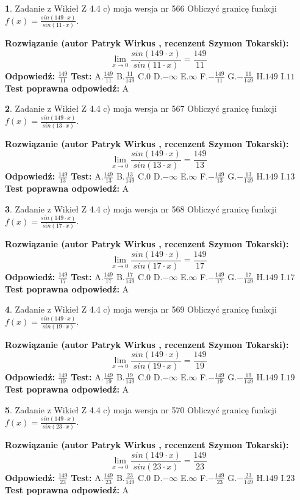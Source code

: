\documentclass[12pt, a4paper]{article}
\theoremstyle{definition} %
\newtheorem{zad}{}
\newcommand{\zadStart}[1]{\begin{zad}#1\newline}
\newcommand{\zadStop}{\end{zad}}
\newcommand{\rozwStart}[2]{\noindent \textbf{Rozwiązanie (autor #1 , recenzent #2): }\newline}
\newcommand{\rozwStop}{\newline}
\newcommand{\odpStart}{\noindent \textbf{Odpowiedź:}\newline}
\newcommand{\odpStop}{\newline}
\newcommand{\testStart}{\noindent \textbf{Test:}\newline}
\newcommand{\testStop}{\newline}
\newcommand{\kluczStart}{\noindent \textbf{Test poprawna odpowiedź:}\newline}
\newcommand{\kluczStop}{\newline}
\begin{document}
\zadStart{Zadanie z Wikieł Z 4.4 c) moja wersja nr 566}
Obliczyć granicę funkcji $f(x)=\frac{sin(149\cdot x)}{sin(11\cdot x)}$.
\zadStop
\rozwStart{Patryk Wirkus}{Szymon Tokarski}
$$\lim\limits_{x\to 0}\frac{sin(149\cdot x)}{sin(11\cdot x)}=
\frac{149}{11}$$
\rozwStop
\odpStart
$\frac{149}{11}$
\odpStop
\testStart
A.$\frac{149}{11}$
B.$\frac{11}{149}$
C.$0$
D.$-\infty$
E.$\infty$
F.$-\frac{149}{11}$
G.$-\frac{11}{149}$
H.$149$
I.$11$
\testStop
\kluczStart
A
\kluczStop



\zadStart{Zadanie z Wikieł Z 4.4 c) moja wersja nr 567}
Obliczyć granicę funkcji $f(x)=\frac{sin(149\cdot x)}{sin(13\cdot x)}$.
\zadStop
\rozwStart{Patryk Wirkus}{Szymon Tokarski}
$$\lim\limits_{x\to 0}\frac{sin(149\cdot x)}{sin(13\cdot x)}=
\frac{149}{13}$$
\rozwStop
\odpStart
$\frac{149}{13}$
\odpStop
\testStart
A.$\frac{149}{13}$
B.$\frac{13}{149}$
C.$0$
D.$-\infty$
E.$\infty$
F.$-\frac{149}{13}$
G.$-\frac{13}{149}$
H.$149$
I.$13$
\testStop
\kluczStart
A
\kluczStop



\zadStart{Zadanie z Wikieł Z 4.4 c) moja wersja nr 568}
Obliczyć granicę funkcji $f(x)=\frac{sin(149\cdot x)}{sin(17\cdot x)}$.
\zadStop
\rozwStart{Patryk Wirkus}{Szymon Tokarski}
$$\lim\limits_{x\to 0}\frac{sin(149\cdot x)}{sin(17\cdot x)}=
\frac{149}{17}$$
\rozwStop
\odpStart
$\frac{149}{17}$
\odpStop
\testStart
A.$\frac{149}{17}$
B.$\frac{17}{149}$
C.$0$
D.$-\infty$
E.$\infty$
F.$-\frac{149}{17}$
G.$-\frac{17}{149}$
H.$149$
I.$17$
\testStop
\kluczStart
A
\kluczStop



\zadStart{Zadanie z Wikieł Z 4.4 c) moja wersja nr 569}
Obliczyć granicę funkcji $f(x)=\frac{sin(149\cdot x)}{sin(19\cdot x)}$.
\zadStop
\rozwStart{Patryk Wirkus}{Szymon Tokarski}
$$\lim\limits_{x\to 0}\frac{sin(149\cdot x)}{sin(19\cdot x)}=
\frac{149}{19}$$
\rozwStop
\odpStart
$\frac{149}{19}$
\odpStop
\testStart
A.$\frac{149}{19}$
B.$\frac{19}{149}$
C.$0$
D.$-\infty$
E.$\infty$
F.$-\frac{149}{19}$
G.$-\frac{19}{149}$
H.$149$
I.$19$
\testStop
\kluczStart
A
\kluczStop



\zadStart{Zadanie z Wikieł Z 4.4 c) moja wersja nr 570}
Obliczyć granicę funkcji $f(x)=\frac{sin(149\cdot x)}{sin(23\cdot x)}$.
\zadStop
\rozwStart{Patryk Wirkus}{Szymon Tokarski}
$$\lim\limits_{x\to 0}\frac{sin(149\cdot x)}{sin(23\cdot x)}=
\frac{149}{23}$$
\rozwStop
\odpStart
$\frac{149}{23}$
\odpStop
\testStart
A.$\frac{149}{23}$
B.$\frac{23}{149}$
C.$0$
D.$-\infty$
E.$\infty$
F.$-\frac{149}{23}$
G.$-\frac{23}{149}$
H.$149$
I.$23$
\testStop
\kluczStart
A
\kluczStop
\end{document}
